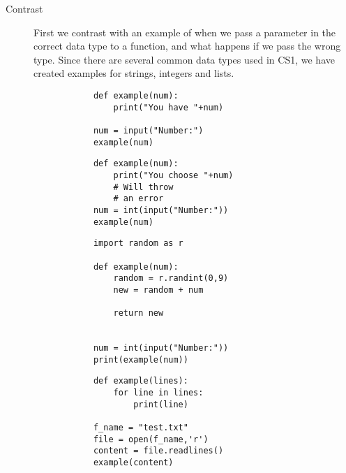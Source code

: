 \begin{description}
    \item[Contrast] First we contrast with an example of when we pass a 
parameter in the correct data type to a function, and what happens if 
we pass the wrong type. Since there are several common data types used 
in CS1, we have created examples for strings, integers and lists. 

     \hfill
     \begin{minipage}[t]{0.45\columnwidth}
        \begin{verbatim}
            def example(num):
                print("You have "+num)

            num = input("Number:")
            example(num)
        \end{verbatim}
    \end{minipage}
\hfill
    \begin{minipage}[t]{0.45\columnwidth}
        \begin{verbatim}
            def example(num):
                print("You choose "+num)
                # Will throw
                # an error
            num = int(input("Number:"))
            example(num)
        \end{verbatim}
    \end{minipage}
\hfill

    \hfill
     \begin{minipage}[t]{0.45\columnwidth}
        \begin{verbatim}
            import random as r
            
            def example(num):
                random = r.randint(0,9)
                new = random + num

                return new

                
            num = int(input("Number:"))
            print(example(num))
        \end{verbatim}
    \end{minipage}
\hfill
    \begin{minipage}[t]{0.45\columnwidth}
        \begin{verbatim}
            def example(lines):
                for line in lines:
                    print(line)

            f_name = "test.txt"
            file = open(f_name,'r')
            content = file.readlines()
            example(content)
        \end{verbatim}
    \end{minipage}
\hfill


\end{description}
